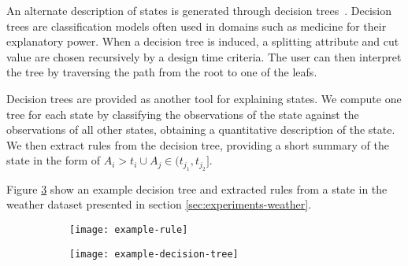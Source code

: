 An alternate description of states is generated through decision trees~\cite{Witten:2005:DMP:1205860}. Decision
trees are classification models often used in domains such as medicine for their explanatory power.
When a decision tree is induced, a splitting attribute and cut value are chosen recursively by a
design time criteria. The user can then interpret the tree by traversing the path from the root 
to one of the leafs.

Decision trees are provided as another tool for explaining states. We compute one tree for each
state by classifying the observations of the state against the observations of all other states,
obtaining a quantitative description of the state. We then extract rules from the decision tree,
providing a short summary of the state in the form of $A_i > t_i \cup A_j \in (t_{j_1}, t_{j_2}]$.

Figure \ref{fig:example-decision-tree-and-rule} show an example decision tree and extracted rules
from a state in the weather dataset presented in section \ref{sec:experiments-weather}.

\begin{figure}[h!]
	\centering
	\begin{subfigure}{.3\columnwidth}
	  	\centering
	  	\texttt{[image: example-rule]}
  		\caption{}
  		\label{fig:example-rule}
	\end{subfigure}
	\begin{subfigure}{.68\columnwidth}
	  	\centering
	  	\texttt{[image: example-decision-tree]}
	  	\caption{}
	  	\label{fig:example-decision-tree}
	\end{subfigure}
	\caption{\lstopar{[TODO]}}
	\label{fig:example-decision-tree-and-rule}
\end{figure}

\iffalse

\subsection{Visual Assistance}

When a state becomes selected, the user interface presents the user with several visual aids which
assist them in identifying the states' meaning. The first of these aids is the timeline histogram
which shows the distribution of the states occurrence over time. An example is shown in Figure 
\ref{fig:time-hist}.

\begin{figure}[h!]
	\centering
	\texttt{[image: timeline]}
	\caption{[TODO example decision tree].}
	\label{fig:time-hist}
\end{figure}

This provides several common time scales (e.g. hourly, daily, weekly, yearly, etc.). This can help identify periodic or cyclic behaviour in the data. 

\primoz{more on decision trees, arbitrary time scales}
[TODO histograms]
\fi
